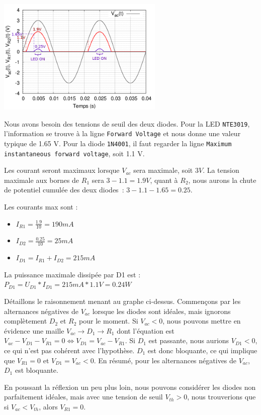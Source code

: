 \documentclass{../template/tp}
\begin{document}
{%
\begin{center} \includegraphics[width=300px]{image2corr.png} \end{center}
Nous avons besoin des tensions de seuil des deux diodes.
Pour la LED \texttt{NTE3019}, l'information se trouve à la ligne \texttt{Forward Voltage} et nous donne une valeur typique de 1.65 V.
Pour la diode \texttt{1N4001}, il faut regarder la ligne \texttt{Maximum instantaneous forward voltage}, soit 1.1 V.

Les courant seront maximaux lorsque $V_{ac}$ sera maximale, soit $3 V$.
La tension maximale aux bornes de $R_1$ sera $3 - 1.1 = 1.9 V$, quant à $R_2$, nous aurons la chute de potentiel cumulée des deux diodes~: $3 - 1.1 - 1.65 = 0.25$.

Les courants max sont :
\begin{itemize}
    \item $I_{R1} = \frac{1.9}{10} = 190mA$
    \item $I_{D2} = \frac{0.25}{10} = 25mA$
    \item $I_{D1} = I_{R1} + I_{D2} = 215mA$
\end{itemize}
La puissance maximale dissipée par D1 est : $P_{D1} = U_{D1}*I_{D1} = 215mA*1.1V = 0.24W$


Détaillons le raisonnement menant au graphe ci-dessus.
Commençons par les alternances négatives de $V_{ac}$ lorsque les diodes sont idéales, mais ignorons complètement $D_2$ et $R_2$ pour le moment.
Si $V_{ac} < 0$, nous pouvons mettre en évidence une maille $V_{ac} \rightarrow D_1 \rightarrow R_1$ dont l'équation est $V_{ac} - V_{D1} - V_{R1} = 0 \Leftrightarrow V_{D1} = V_{ac} - V_{R1}$. Si $D_1$ est passante, nous aurions $V_{D1} < 0$, ce qui n'est pas cohérent avec l'hypothèse.
$D_1$ est donc bloquante, ce qui implique que $V_{R1} = 0$ et $V_{D1} = V_{ac} < 0$.
En résumé, pour les alternances négatives de $V_{ac}$, $D_1$ est bloquante.

En poussant la réflexion un peu plus loin, nous pouvons considérer les diodes non parfaitement idéales, mais avec une tension de seuil $V_{th} > 0$, nous trouverions que si $V_{ac} < V_{th}$, alors $V_{R1} = 0$.

}
\end{document}
